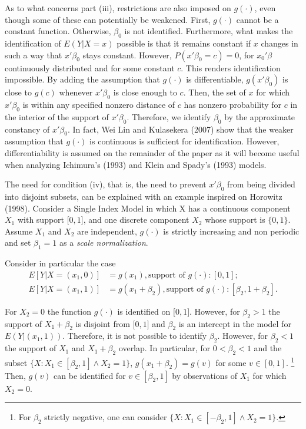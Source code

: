 \documentclass[a4paper]{article}
\begin{document}
As to what concerns part (iii), restrictions are also imposed on $g(\cdot)$, even though some of these can potentially be weakened. First, $g(\cdot)$ cannot be a constant function. Otherwise, $\beta_0$ is not identified. Furthermore, what makes the identification of $E(Y|X = x)$ possible is that it remains constant if $x$ changes in such a way that $x'\beta_0$ stays constant. However, $P(x'\beta_0 = c)=0$, for $x_0'\beta$ continuously distributed and for some constant $c$. This renders identification impossible. By adding the assumption that $g(\cdot)$ is differentiable, $g(x'\beta_0)$ is close to $g(c)$ whenever $x'\beta_0$ is close enough to $c$. Then, the set of $x$ for which $x'\beta_0$ is within any specified nonzero distance of $c$ has nonzero probability for $c$ in the interior of the support of $x'\beta_0$. Therefore, we identify $\beta_0$ by the approximate constancy of $x'\beta_0$. In fact, Wei Lin and Kulasekera (2007) show that the weaker assumption that $g(\cdot)$ is continuous is sufficient for identification. However, differentiability is assumed on the remainder of the paper as it will become useful when analyzing Ichimura's (1993) and Klein and Spady's (1993) models.

The need for condition (iv), that is,  the need to prevent $x'\beta_0$  from being divided into disjoint subsets, can be explained with an example inspired on Horowitz (1998). Consider a Single Index Model in which X has a continuous component $X_1$ with support $\big[0,1\big]$, and one discrete component $X_2$ whose support is $\{0,1\}$. Assume $X_1$ and $X_2$ are independent, $g(\cdot)$ is strictly increasing and non periodic and set $\beta_1 = 1$ as a \textit{scale normalization}. 

Consider in particular the case
\[
\begin{split}
E[Y| X = (x_1,0)]& = g(x_1), \text{support\ of } g(\cdot): [0,1];  \\
E[Y| X = (x_1,1)]& = g(x_1+\beta_2), \text{support\ of } g(\cdot): [\beta_2,1+\beta_2].
\end{split}
\]

For $X_2 = 0$ the function $g(\cdot)$ is identified on $\big[0,1\big]$. However, for $\beta_2 > 1$ the support of $ X_1 + \beta_2$ is disjoint from $\big[0,1\big]$ and $\beta_2$ is an intercept in the model for $E(Y|(x_1,1))$. Therefore, it is not possible to identify $\beta_2$. However, for $\beta_2 < 1$ the support of $X_1$ and $X_1 + \beta_2$ overlap. In particular, for $0<\beta_2<1$  and the subset $\{X: X_1 \in [\beta_2, 1] \wedge X_2 = 1\}$, $g(x_1 + \beta_2) = g(v)$ for some $v \in [0,1]$. \footnote{For $\beta_2$ strictly negative, one can consider $\{X: X_1 \in [ - \beta_2, 1] \wedge X_2 = 1\}$.} Then, $g(v)$ can be identified for $v \in [\beta_2, 1]$ by observations of $X_1$ for which $X_2 = 0$. 
\end{document}

